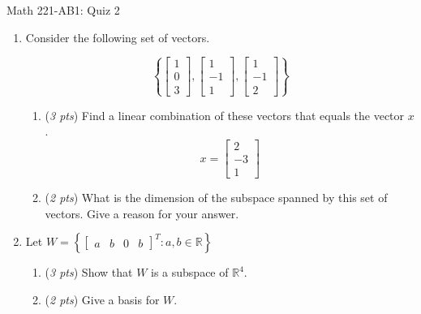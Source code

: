 \documentclass[11pt]{article}
\begin{document}
\begin{center}
\Large
\rm{Math 221-AB1:  Quiz 2}
\\
\end{center}
\vspace{0.1in}
\begin{enumerate}

\item{ Consider the following set of vectors.
	
	\begin{displaymath}
	\left\{
	\left[ \begin{array}{r} 1 \\ 0 \\ 3  \end{array}\right],
	\left[ \begin{array}{r} 1 \\ -1  \\ 1 \end{array}\right],
	\left[ \begin{array}{r} 1 \\ -1  \\ 2 \end{array}\right]
	\right\}
	\end{displaymath}

\begin{enumerate}
	\item {(\emph{3 pts}) Find a linear combination of these vectors that equals the vector $x$.
		\begin{displaymath}
	x = \left[ \begin{array}{r} 2 \\ -3 \\ 1  \end{array}\right]
	\end{displaymath}}
	\vspace{2.5in}
	\item{(\emph{2 pts}) What is the dimension of the subspace spanned by this set of vectors.  Give a reason for your answer.}
\end{enumerate}
}



\vspace{2in}

\item{Let $W = \left\{\left[ \begin{array}{rrrr} a & b & 0 & b \end{array} \right]^T: a,b\in\mathbb{R}\right\}$
\begin{enumerate}
	\item {(\emph{3 pts}) Show that $W$ is a subspace of $\mathbb{R}^4$.}
	\item {(\emph{2 pts}) Give a basis for $W$.}
\end{enumerate} 

}
\end{enumerate}
\end{document}
